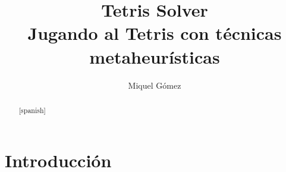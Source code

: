 \documentclass[11pt,spanish,listoffigures,listoftables]{tfgetsinf}
\title{Tetris Solver \\ Jugando al Tetris con técnicas metaheurísticas}
\author{Miquel Gómez}
\begin{document}
 




\begin{abstract}[spanish]

\end{abstract}


\clearpage
\tableofcontents



\chapter{Introducción}
\end{document}
